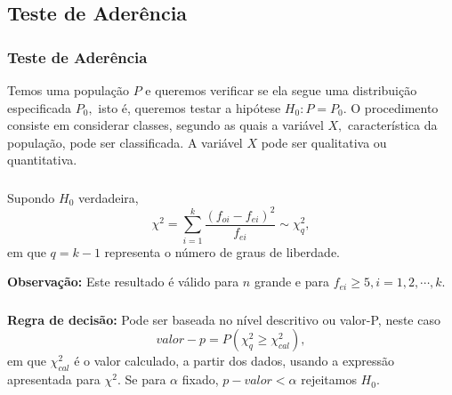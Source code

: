 \documentclass[14pt,aspectratio=1610]{beamer}
\newcommand{\Ho}{\ensuremath{H_{0}}}
\begin{document}
\subsection{Teste de Aderência}
\begin{frame}{}
\frametitle{Teste de Aderência}
\begin{block}{}
\justifying
Temos uma população $P$ e queremos verificar se ela segue uma distribuição
especificada $P_{0},$ isto é, queremos testar a hipótese $\Ho: P = P_{0}.$ O procedimento consiste em considerar classes, segundo as quais a variável $X,$ característica da população, pode ser classificada. A variável $X$ pode ser qualitativa ou quantitativa.
\end{block}
\end{frame}

% 

\begin{frame}{}
\frametitle{}
\begin{block}{}
\justifying
Supondo $\Ho$ verdadeira, 
$$\chi^{2}={\displaystyle \sum_{i=1}^{k}\dfrac{(f_{oi}-f_{ei})^{2}}{f_{ei}}}\sim \chi^{2}_{q},$$
em que $q=k-1$ representa o número de graus de liberdade. 

{\bf Observação:} Este resultado é válido para $n$ grande e para $f_{ei}\geq 5, i=1,2,\cdots, k.$
\end{block}
\end{frame}

\begin{frame}{}
\frametitle{}
\begin{block}{}
\justifying
{\bf Regra de decisão:} Pode ser baseada no nível descritivo ou valor-P, neste caso
$$valor-p=P(\chi^{2}_{q}\geq \chi^{2}_{cal}),$$
em que $\chi^{2}_{cal}$ é o valor calculado, a partir dos dados, usando a expressão apresentada para $\chi^{2}.$ Se para $\alpha$ fixado, $p-valor<\alpha$ rejeitamos $\Ho.$

\end{block}
\end{frame}
\end{document}
